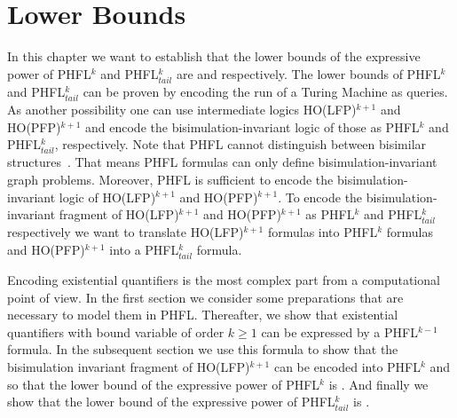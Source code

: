 
\chapter{Lower Bounds}\label{ch:lowerBounds}

In this chapter we want to establish that the lower bounds of the expressive power of PHFL$^k$ and PHFL$^k_{tail}$ are  and  respectively. The
lower bounds of PHFL$^k$ and PHFL$^k_{tail}$ can be proven by encoding the run of a Turing Machine as queries.
As another possibility one can use intermediate logics HO(LFP)$^{k+1}$ and HO(PFP)$^{k+1}$ and encode the bisimulation-invariant logic of those as PHFL$^k$ and
PHFL$^k_{tail}$, respectively. Note that PHFL cannot distinguish between bisimilar structures~\cite{viswanathan2004higher}. That means PHFL formulas can only define bisimulation-invariant
graph problems. Moreover, PHFL is sufficient to encode the bisimulation-invariant logic of HO(LFP)$^{k+1}$ and HO(PFP)$^{k+1}$. To encode the bisimulation-invariant fragment of HO(LF\-P)$^{k+1}$ and HO(PFP)$^{k+1}$ as PHFL$^k$ and
PHFL$^{k}_{tail}$ respectively we want to translate HO(LFP)$^{k+1}$ formulas into PHFL$^k$ formulas and 
HO(PFP)$^{k+1}$ into a PHFL$^k_{tail}$ formula. 

Encoding existential quantifiers is the most complex part from a computational point of view. In the 
first section we consider some preparations that are necessary to model them in PHFL. Thereafter,  we show that existential 
quantifiers with bound variable of order $k \geq 1$ can be expressed by a PHFL$^{k-1}$ formula. In the subsequent section we 
use this formula to show that the bisimulation invariant fragment of HO(LFP)$^{k+1}$ can be encoded into PHFL$^k$ and so 
that the lower bound of the expressive power of PHFL$^k$ is . And finally we show that the lower bound 
of the expressive power of PHFL$^k_{tail}$ is .








